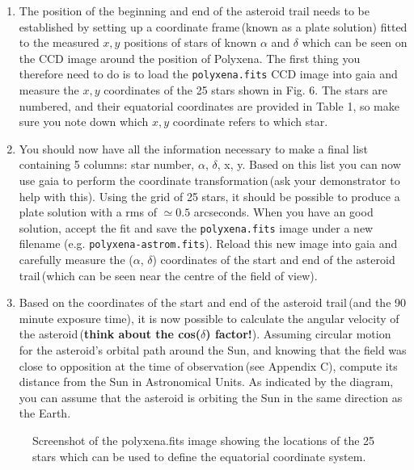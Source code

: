 \begin{enumerate}

\item The position of the beginning and end of the asteroid trail needs to be established by setting up a coordinate frame\,(known as a plate solution) fitted to the measured $x,y$ positions of stars of known $\alpha$ and $\delta$ which can be seen on the CCD image around the position of Polyxena. The first thing you therefore need to do is to load the {\tt polyxena.fits} CCD image into {\sc gaia} and measure the $x,y$ coordinates of the 25 stars shown in Fig. 6. The stars are numbered, and their equatorial coordinates are provided in Table 1, so make sure you note down which $x,y$ coordinate refers to which star. 

\item You should now have all the information necessary to make a final list containing 5 columns: star number, $\alpha$, $\delta$, x, y. Based on this list you can now use {\sc gaia} to perform the coordinate transformation\,(ask your demonstrator to help with this). Using the grid of 25 stars, it should be possible to produce a plate solution with a rms of $\simeq 0.5$ arcseconds. When you have an good solution, accept the fit and save the {\tt polyxena.fits} image under a new filename (e.g. {\tt polyxena-astrom.fits}). Reload this new image into {\sc gaia} and carefully measure the ($\alpha$, $\delta$) coordinates of the start and end of the asteroid trail\,(which can be seen near the centre of the field of view).

\item Based on the coordinates of the start and end of the asteroid trail\,(and the 90 minute exposure time), it is now possible to calculate the angular velocity of the asteroid\,({\bf think about the cos($\delta$) factor!}). Assuming circular motion for the asteroid's orbital path around the Sun, and knowing that the field was close to opposition at the time of observation\,(see Appendix C), compute its distance from the Sun in Astronomical Units. As indicated by the diagram, you can assume that
the asteroid is orbiting the Sun in the same direction as the Earth.

\end{enumerate}

\newpage

\begin{figure}
\centerline{}
\caption{Screenshot of the polyxena.fits image showing the locations of the 25 stars which can be used to define the equatorial coordinate system.}
\end{figure}

